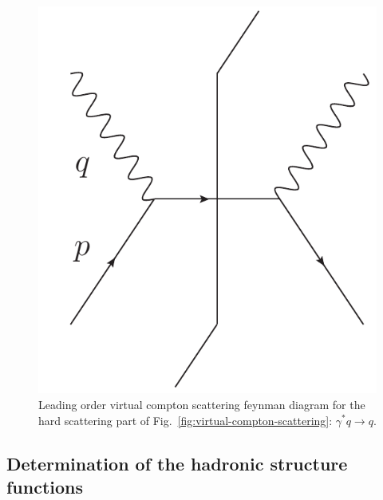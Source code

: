 \documentclass[aps,prd,amsmath,superscriptaddress,floatfix,nofootinbib]{revtex4-2}
\newcommand{\fref}[1]{Fig.~\ref{fig:#1}}
\begin{document}
\begin{figure}[h!tb]
\begin{center} 
    \includegraphics[width=0.2\paperwidth]{DIS_LO.pdf}
    \caption{Leading order virtual compton scattering feynman diagram for the hard scattering part of \fref{virtual-compton-scattering}: $\gamma^{*}q \rightarrow q$.}
    \label{fig:virtual-compton-scattering-LO}
\end{center}
\end{figure}


\subsection{Determination of the hadronic structure functions}
\label{ss:determination-of-the-hadronic-structure-functions}
\end{document}
